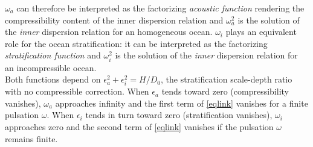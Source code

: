 \documentclass[a4paper,11pt]{article}
\begin{document}
$\omega_a$ can therefore be interpreted as the factorizing \textit{acoustic function} rendering the compressibility content of the inner dispersion relation and $\omega_a^2$ is the solution of the \textit{inner} dispersion relation for an homogeneous ocean. $\omega_i$ plays an equivalent role for the ocean stratification: it can be interpreted as the factorizing \textit{stratification function} and $\omega_i^2$ is the solution of the \textit{inner} dispersion relation for an incompressible ocean.\\
Both functions depend on $\epsilon_a^2+\epsilon_i^2 = H/D_0$, the stratification scale-depth ratio with no compressible correction. 
When $\epsilon_a$ tends toward zero (compressibility vanishes), $\omega_a$ approaches infinity and the first term of \ref{eqlink} vanishes for a finite pulsation $\omega$. 
When $\epsilon_i$ tends in turn toward zero (stratification vanishes), $\omega_i$ approaches zero and the second term of \ref{eqlink} vanishes if the pulsation $\omega$ remains finite. 
\end{document}
